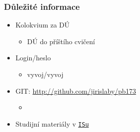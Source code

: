 


\subtitle{II. Komunikace}
\date{27. 9. \the\year}



\begin{frame}
  \titlepage
\end{frame}


\begin{frame}
  \frametitle{Důležité informace}

  \begin{itemize}

  \item Kolokvium za DÚ
  \begin{itemize}
  \item DÚ do příštího cvičení
  \end{itemize}

  \item Login/heslo
  \begin{itemize}
  \item vyvoj/vyvoj
  \end{itemize}

  \item GIT: \url{http://github.com/jirislaby/pb173}
  \begin{itemize}
  \item {}
  \end{itemize}

  \item Studijní materiály v \href{https://is.muni.cz/auth/el/1433/podzim2015/PB173/index.qwarp}{\nolinkurl{ISu}}
  \end{itemize}
\end{frame}





